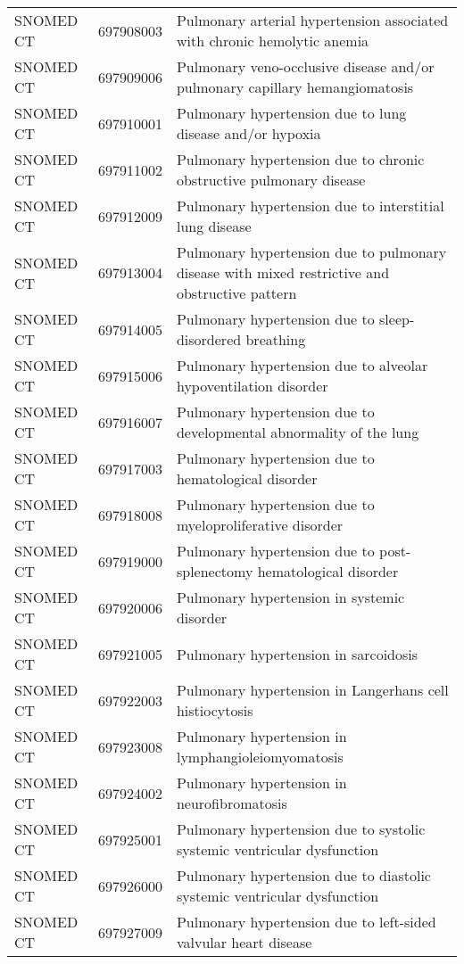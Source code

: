 \begin{table}[ht]
\begin{tabular}{lll}
  SNOMED CT & 697908003 & Pulmonary arterial hypertension associated with chronic hemolytic anemia \\ 
  SNOMED CT & 697909006 & Pulmonary veno-occlusive disease and/or pulmonary capillary hemangiomatosis \\ 
  SNOMED CT & 697910001 & Pulmonary hypertension due to lung disease and/or hypoxia \\ 
  SNOMED CT & 697911002 & Pulmonary hypertension due to chronic obstructive pulmonary disease \\ 
  SNOMED CT & 697912009 & Pulmonary hypertension due to interstitial lung disease \\ 
  SNOMED CT & 697913004 & Pulmonary hypertension due to pulmonary disease with mixed restrictive and obstructive pattern \\ 
  SNOMED CT & 697914005 & Pulmonary hypertension due to sleep-disordered breathing \\ 
  SNOMED CT & 697915006 & Pulmonary hypertension due to alveolar hypoventilation disorder \\ 
  SNOMED CT & 697916007 & Pulmonary hypertension due to developmental abnormality of the lung \\ 
  SNOMED CT & 697917003 & Pulmonary hypertension due to hematological disorder \\ 
  SNOMED CT & 697918008 & Pulmonary hypertension due to myeloproliferative disorder \\ 
  SNOMED CT & 697919000 & Pulmonary hypertension due to post-splenectomy hematological disorder \\ 
  SNOMED CT & 697920006 & Pulmonary hypertension in systemic disorder \\ 
  SNOMED CT & 697921005 & Pulmonary hypertension in sarcoidosis \\ 
  SNOMED CT & 697922003 & Pulmonary hypertension in Langerhans cell histiocytosis \\ 
  SNOMED CT & 697923008 & Pulmonary hypertension in lymphangioleiomyomatosis \\ 
  SNOMED CT & 697924002 & Pulmonary hypertension in neurofibromatosis \\ 
  SNOMED CT & 697925001 & Pulmonary hypertension due to systolic systemic ventricular dysfunction \\ 
  SNOMED CT & 697926000 & Pulmonary hypertension due to diastolic systemic ventricular dysfunction \\ 
  SNOMED CT & 697927009 & Pulmonary hypertension due to left-sided valvular heart disease \\ 

\end{tabular}
\end{table}
